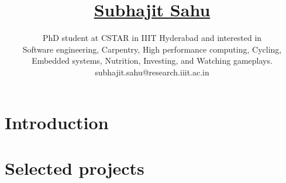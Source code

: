 \documentclass[11pt]{article}
\title{
  \vspace{-6ex}
  \href{https://wolfram77.github.io/}{Subhajit Sahu}
  \vspace{-4ex}
}
\author{
  PhD student at CSTAR in IIIT Hyderabad and interested in \\
  Software engineering, Carpentry, High performance computing, Cycling, \\
  Embedded systems, Nutrition, Investing, and Watching gameplays. \\
  {\small subhajit.sahu@research.iiit.ac.in}
}
\date{}
\begin{document}
\maketitle
\vspace{-9ex}

\section{Introduction}




% 

\section{Selected projects}


\appendix
\small


\end{document}
